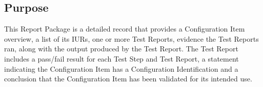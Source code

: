 \subsection{Purpose}
This Report Package is a detailed record that provides a Configuration Item 
overview, a list of its IURs, one or more Test Reports, evidence the Test 
Reports ran, along with the output produced by the Test Report. The Test 
Report includes a pass/fail result for each Test Step and Test Report, a 
statement indicating the Configuration Item has a Configuration Identification 
and a conclusion that the Configuration Item has been validated for its 
intended use.